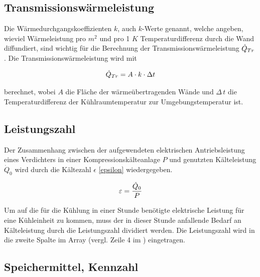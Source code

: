 \subsection{Transmissionswärmeleistung}

Die Wärmedurchgangskoeffizienten $k$, auch $k$-Werte genannt, welche angeben, wieviel Wärmeleistung pro $m^2$ und pro 1 $K$
Temperaturdifferenz durch die Wand diffundiert, sind wichtig für die Berechnung der Transmissionswärmeleistung $\dot{Q}_{Tr}$. Die
Transmissionswärmeleistung wird mit

\begin{equation}
	\ptrans = A \cdot k \cdot \Delta t \label{ptrans}
\end{equation}

\noindent berechnet, wobei $A$ die Fläche der wärmeübertragenden Wände und $\Delta \, t$ die Temperaturdifferenz der
Kühlraumtemperatur zur Umgebungstemperatur ist.

\subsection{Leistungszahl}
\label{Leistungszahl}
Der Zusammenhang zwischen der aufgewendeten elektrischen Antriebsleistung eines Verdichters in einer Kompressionskälteanlage
$P$ und genutzten Kälteleistung ${\dot{Q}}_0$ wird durch die Kältezahl $\epsilon$ \cref{epsilon} wiedergegeben.

\begin{equation}
	\epsilon = \frac{\pkalt}{P}
\label{epsilon}
\end{equation}

\noindent Um auf die für die Kühlung in einer Stunde benötigte elektrische Leistung für eine Kühleinheit zu kommen, muss der
in dieser Stunde anfallende Bedarf an Kälteleistung durch die Leistungszahl dividiert werden. Die Leistungszahl wird in die
zweite Spalte im Array (vergl. Zeile 4 im ) eingetragen.

\subsection{Speichermittel, Kennzahl}


